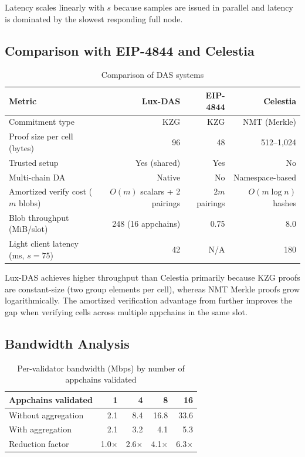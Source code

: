 \documentclass[11pt,a4paper]{article}
\theoremstyle{plain}
\theoremstyle{definition}
\theoremstyle{remark}
\begin{document}
Latency scales linearly with $s$ because samples are issued in parallel and latency is
dominated by the slowest responding full node.

\subsection{Comparison with EIP-4844 and Celestia}

\begin{table}[H]
\centering
\caption{Comparison of DAS systems}
\label{tab:comparison}
\begin{tabular}{lrrr}
\toprule
\textbf{Metric} & \textbf{Lux-DAS} & \textbf{EIP-4844} & \textbf{Celestia} \\
\midrule
Commitment type & KZG & KZG & NMT (Merkle) \\
Proof size per cell (bytes) & 96 & 48\footnotemark & 512--1{,}024 \\
Trusted setup & Yes (shared) & Yes & No \\
Multi-chain DA & Native & No & Namespace-based \\
Amortized verify cost ($m$ blobs) & $O(m)$ scalars + 2 pairings & $2m$ pairings & $O(m \log n)$ hashes \\
Blob throughput (MiB/slot) & 248 (16 appchains) & 0.75 & 8.0 \\
Light client latency (ms, $s=75$) & 42 & N/A\footnotemark & 180 \\
\bottomrule
\end{tabular}
\end{table}
\addtocounter{footnote}{-1}

Lux-DAS achieves higher throughput than Celestia primarily because KZG proofs are constant-size
(two group elements per cell), whereas NMT Merkle proofs grow logarithmically. The amortized
verification advantage from  further improves the gap when
verifying cells across multiple appchains in the same slot.

\subsection{Bandwidth Analysis}

\begin{table}[H]
\centering
\caption{Per-validator bandwidth (Mbps) by number of appchains validated}
\label{tab:bandwidth}
\begin{tabular}{lrrrr}
\toprule
\textbf{Appchains validated} & 1 & 4 & 8 & 16 \\
\midrule
Without aggregation & 2.1 & 8.4 & 16.8 & 33.6 \\
With aggregation & 2.1 & 3.2 & 4.1 & 5.3 \\
Reduction factor & 1.0$\times$ & 2.6$\times$ & 4.1$\times$ & 6.3$\times$ \\
\bottomrule
\end{tabular}
\end{table}
\end{document}
